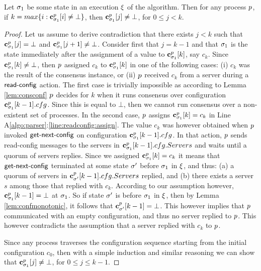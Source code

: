 \begin{lemma}
\label{lem:nogaps}
	Let $\sigma_1$ be some state in an execution $\EX$ of the algorithm. Then for any 
	process $p$, if $k = max\{i: \mathbf{c}^{p}_{\sigma_1}[i]\neq \bot\}$, then 
	$\mathbf{c}^{p}_{\sigma_1}[j]\neq \bot$, for $0\leq j < k$.
\end{lemma}
\begin{proof}
	Let us assume to derive contradiction that there exists $j < k$ such that 
	$\mathbf{c}^{p}_{\sigma_1}[j]=\bot$ and $\mathbf{c}^{p}_{\sigma_1}[j+1]\neq\bot$.
	Consider first that $j = k-1$ and that $\sigma_1$ is the state immediately 
	after the assignment of a value to $\mathbf{c}^{p}_{\sigma_1}[k]$, say $c_k$. 
	Since $\mathbf{c}^{p}_{\sigma_1}[k]\neq\bot$, then $p$ assigned $c_k$ to $\mathbf{c}^{p}_{\sigma_1}[k]$ 
	in one of the following cases: 
	(i) $c_k$ was the result of the consensus instance, or
	(ii) $p$ received $c_k$ from a server during a $\act{read-config}$ action.
	The first case is trivially impossible as according to Lemma \ref{lem:consconf} 
	$p$ decides for $k$ when it runs consensus over configuration $\mathbf{c}^{p}_{\sigma_1}[k-1].cfg$. 
	Since this is equal to $\bot$, then we cannot run consensus over a non-existent set of 
	processes. 	In the second case, $p$ assigns $\mathbf{c}^{p}_{\sigma_1}[k] = c_k$  in Line A\ref{algo:parser}:\ref{line:readconfig:assign}.
	The value $c_k$ was however obtained when $p$ invoked $\act{get-next-config}$ on 
	configuration $\mathbf{c}^{p}_{\sigma_1}[k-1].cfg$. In that action, $p$ sends {\sc read-config}
	messages to the servers in $\mathbf{c}^{p}_{\sigma_1}[k-1].cfg.Servers$ and waits until a quorum 
	of servers replies. Since we assigned $\mathbf{c}^{p}_{\sigma_1}[k] = c_k$ it means that $\act{get-next-config}$
	terminated at some state $\sigma'$ before $\sigma_1$ in $\EX$, and thus: 
	(a) a quorum of servers in $\mathbf{c}^{p}_{\sigma'}[k-1].cfg.Servers$
	replied, and (b) there exists a server $s$ among those that replied with $c_k$. 
	According to our assumption however, $\mathbf{c}^{p}_{\sigma_1}[k-1] = \bot$ at $\sigma_1$. 
	So if state $\sigma'$ is before $\sigma_1$ in $\EX$, %
	then by Lemma \ref{lem:confmonotonic}, it follows that $\mathbf{c}^{p}_{\sigma'}[k-1] = \bot$. This however 
	implies that $p$ communicated with an empty configuration, and thus no server replied to $p$. 
	This however contradicts the assumption that a server replied with $c_k$ to $p$. 
	
	Since any process traverses the configuration sequence starting from the initial 
	configuration $c_0$, then with a simple induction and similar reasoning we can show that 
	$\mathbf{c}^{p}_{\sigma_1}[j]\neq \bot$, for $0\leq j\leq k-1$.
\end{proof}

